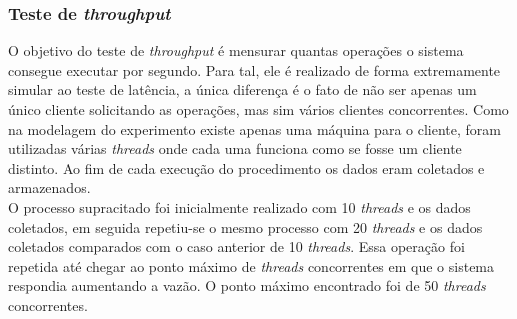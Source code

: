 	\subsubsection{Teste de \textit{throughput}}	
	O objetivo do teste de \textit{throughput} é mensurar quantas operações o sistema consegue executar por segundo. Para tal, ele é realizado de forma extremamente simular ao teste de latência, a única diferença é o fato de não ser apenas um único cliente solicitando as operações, mas sim vários clientes concorrentes. Como na modelagem do experimento existe apenas uma máquina para o cliente, foram utilizadas várias \textit{threads} onde cada uma funciona como se fosse um cliente distinto. Ao fim de cada execução do procedimento os dados eram coletados e armazenados.
	\\
	
	O processo supracitado foi inicialmente realizado com 10 \textit{threads} e os dados coletados, em seguida repetiu-se o mesmo processo com 20 \textit{threads} e os dados coletados comparados com o caso anterior de 10 \textit{threads}. Essa operação foi repetida até chegar ao ponto máximo de \textit{threads} concorrentes em que o sistema respondia aumentando a vazão. O ponto máximo encontrado foi de 50 \textit{threads} concorrentes.
	\\